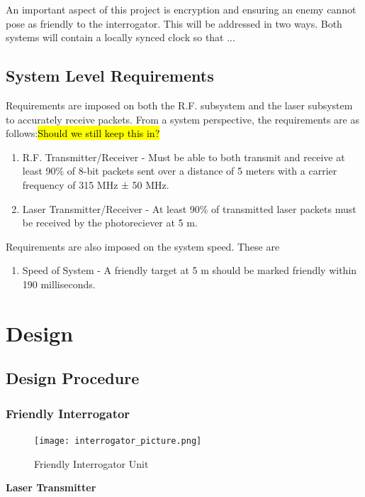 \documentclass[letterpaper,10pt]{article}
\begin{document}
\begin{spacing}{1.15}
An important aspect of this project is encryption and ensuring an enemy cannot pose as friendly to the interrogator. This will be addressed in two ways. Both systems will contain a locally synced clock so that ...


\subsection{System Level Requirements}
Requirements are imposed on both the R.F. subsystem and the laser subsystem to accurately receive packets. From a system perspective, the requirements are as follows:\hl{Should we still keep this in?}
\begin{enumerate}
	\item R.F. Transmitter/Receiver - Must be able to both transmit and receive at least 90\% of 8-bit packets sent over a distance of 5 meters with a carrier frequency of 315 MHz ± 50 MHz.
	\item Laser Transmitter/Receiver - At least 90\% of transmitted laser packets must be received by the photoreciever at 5 m.
\end{enumerate}

Requirements are also imposed on the system speed. These are 
\begin{enumerate}
	\item Speed of System - A friendly target at 5 m should be marked friendly within 190 milliseconds.
\end{enumerate}




\section{Design}

\subsection{Design Procedure} 

\subsubsection{Friendly Interrogator}
\begin{figure} [H]
	\centering
	\texttt{[image: interrogator\_picture.png]}
	\caption{Friendly Interrogator Unit\label{fig:threshold}}
\end{figure}

\hspace{5mm}\textbf{Laser Transmitter} \label{section:laser-transmitter-design-procedure}


\end{spacing}
\end{document}
